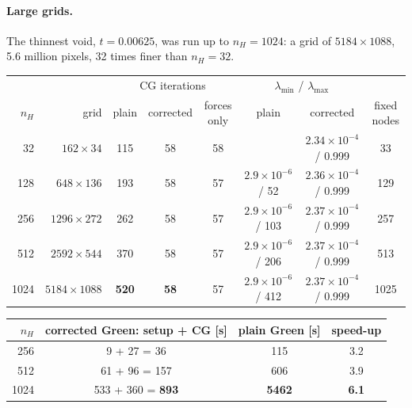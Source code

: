 \documentclass[11pt,a4paper]{article}
\begin{document}
\paragraph{Large grids.} The thinnest void, $t = 0.00625$, was run up to $n_H = 1024$: a grid of $5184 \times 1088$, 5.6
million pixels, 32 times finer than $n_H = 32$.

\begin{center}
\footnotesize\setlength{\tabcolsep}{4pt}
\begin{tabular}{rrcccccc}
  \toprule
  & & \multicolumn{3}{c}{CG iterations} & \multicolumn{2}{c}{$\lambda_{\min}$ / $\lambda_{\max}$} & \\
  $n_H$ & grid & plain & corrected & forces only & plain & corrected & fixed nodes \\
  \midrule
  32   & $162 \times 34$     & 115 & 58 & 58 & & $2.34\times10^{-4}$ / 0.999 & 33 \\
  128  & $648 \times 136$    & 193 & 58 & 57 & $2.9\times10^{-6}$ / 52  & $2.36\times10^{-4}$ / 0.999 & 129 \\
  256  & $1296 \times 272$   & 262 & 58 & 57 & $2.9\times10^{-6}$ / 103 & $2.37\times10^{-4}$ / 0.999 & 257 \\
  512  & $2592 \times 544$   & 370 & 58 & 57 & $2.9\times10^{-6}$ / 206 & $2.37\times10^{-4}$ / 0.999 & 513 \\
  1024 & $5184 \times 1088$  & \textbf{520} & \textbf{58} & 57 & $2.9\times10^{-6}$ / 412 & $2.37\times10^{-4}$ / 0.999 & 1025 \\
  \bottomrule
\end{tabular}

\vspace{6pt}
\begin{tabular}{rccc}
  \toprule
  $n_H$ & corrected Green: setup + CG [s] & plain Green [s] & speed-up \\
  \midrule
  256  & 9 + 27 = 36        & 115  & 3.2 \\
  512  & 61 + 96 = 157      & 606  & 3.9 \\
  1024 & 533 + 360 = \textbf{893} & \textbf{5462} & \textbf{6.1} \\
  \bottomrule
\end{tabular}
\end{center}
\end{document}
